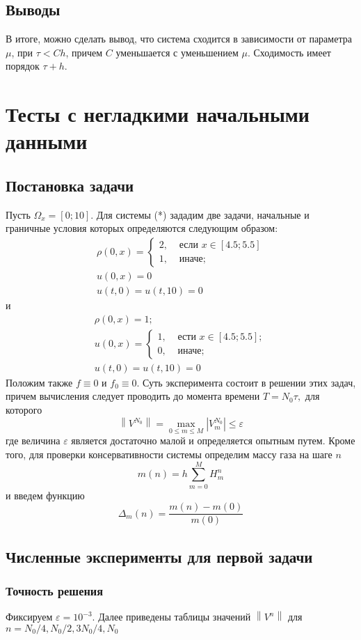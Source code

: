 \documentclass[12pt]{article}
\begin{document}
\subsection{Выводы}
В итоге, можно сделать вывод, что система сходится в зависимости от параметра $\mu$, при $\tau < C h$, причем $C$ уменьшается с уменьшением $\mu$. Сходимость имеет порядок $\tau +  h$.
\section{Тесты с негладкими начальными данными}
\subsection{Постановка задачи}
Пусть $\Omega_{x}=[0 ; 10]$. Для системы (*) зададим две задачи, начальные и граничные условия которых определяются следующим образом:
$$
\begin{array}{l}
\rho(0, x)=\left\{\begin{array}{ll}
2, & \text { если } x \in[4.5 ; 5.5] \\
1, & \text { иначе; }
\end{array}\right. \\
u(0, x)=0 \\
u(t, 0)=u(t, 10)=0
\end{array}
$$
и
$$
\begin{array}{l}
\rho(0, x)=1 ; \\
u(0, x)=\left\{\begin{array}{ll}
1, & \text { ести } x \in[4.5 ; 5.5] ; \\
0, & \text { иначе; }
\end{array}\right. \\
u(t, 0)=u(t, 10)=0
\end{array}
$$
Положим также $f \equiv 0$ и $f_{0} \equiv 0 .$
Суть эксперимента состоит в решении этих задач, причем вычисления следует проводить до момента времени $T=N_{0} \tau,$ для которого
$$
\left\|V^{N_{0}}\right\|=\max _{0 \leq m \leq M}\left|V_{m}^{N_{0}}\right| \leq \varepsilon
$$
где величина $\varepsilon$ является достаточно малой и определяется опытным путем. Кроме того, для проверки консервативности системы определим массу газа на шаге $n$
$$
m(n)=h \sum_{m=0}^{M} H_{m}^{n}
$$
и введем функцию
$$
\Delta_{m}(n)=\frac{m(n)-m(0)}{m(0)}
$$
\subsection{Численные эксперименты для первой задачи}
\subsubsection{Точность решения}
Фиксируем $\varepsilon = 10^{-3}$. Далее приведены таблицы значений $\left\|V^{n}\right\|$
для $n = N_{0} / 4, N_{0} / 2, 3N_{0} / 4, N_{0}$ 
\end{document}
